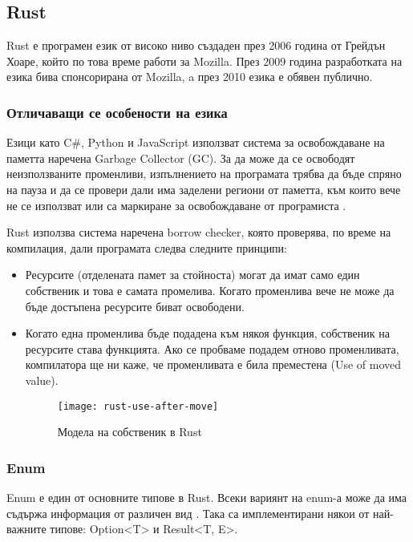 \subsection{Rust}
Rust е програмен език от високо ниво създаден през 2006 година от Грейдън
Хоаре, който по това време работи за Mozilla. През 2009 година разработката на
езика бива спонсорирана от Mozilla, a през 2010 езика е обявен публично.
\cite{Rust_Origins_Wikipedia}

\subsubsection{Отличаващи се особености на езика}

Езици като C\#, Python и JavaScript използват система за освобождаване на паметта
наречена Garbage Collector (GC). За да може да се освободят неизползваните
променливи, изпълнението на програмата трябва да бъде спряно на пауза и да се
провери дали има заделени региони от паметта, към които вече не се използват
или са маркиране за освобождаване от програмиста \cite{Garbage_Collection_Wikipedia}.

Rust използва система наречена borrow checker, която проверява, по време на
компилация, дали програмата следва следните принципи:

\begin{itemize}

\item Ресурсите (отделената памет за стойноста) могат да имат само един
собственик и това е самата промелива. Когато променлива вече не може да бъде
достъпена ресурсите биват освободени.

\item Когато една променлива бъде подадена към някоя функция, собственик на
ресурсите става функцията. Ако се пробваме подадем отново променливата,
компилатора ще ни каже, че променливата е била преместена (Use of moved value).
\begin{figure}[!htb]
  \texttt{[image: rust-use-after-move]}
  \centering
  \caption{Модела на собственик в Rust}
  \label{fig:rust-use-after-move}
\end{figure}

\end{itemize}

\subsubsection{Enum}
Enum е един от основните типове в Rust. Всеки вариянт на enum-а може да има
съдържа информация от различен вид \cite{Rust_Enums}. Така са имплементирани
някои от най-важните типове: Option<T> и Result<T, E>.


